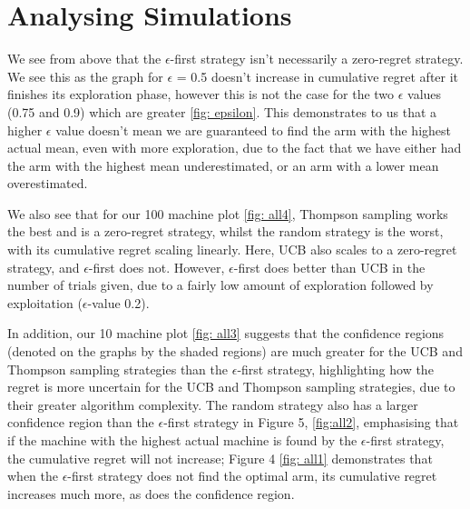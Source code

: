 \section{Analysing Simulations}
We see from above that the $\epsilon$-first strategy isn't necessarily a zero-regret strategy. We see this as the graph for $\epsilon$ = 0.5 doesn't increase in cumulative regret after it finishes its exploration phase, however this is not the case for the two $\epsilon$ values (0.75 and 0.9) which are greater \ref{fig: epsilon}. This demonstrates to us that a higher $\epsilon$ value doesn't mean we are guaranteed to find the arm with the highest actual mean, even with more exploration, due to the fact that we have either had the arm with the highest mean underestimated, or an arm with a lower mean overestimated.

We also see that for our 100 machine plot \ref{fig: all4}, Thompson sampling works the best and is a zero-regret strategy, whilst the random strategy is the worst, with its cumulative regret scaling linearly. Here, UCB also scales to a zero-regret strategy, and $\epsilon$-first does not. However, $\epsilon$-first does better than UCB in the number of trials given, due to a fairly low amount of exploration followed by exploitation ($\epsilon$-value 0.2).

In addition, our 10 machine plot \ref{fig: all3} suggests that the confidence regions (denoted on the graphs by the shaded regions) are much greater for the UCB and Thompson sampling strategies than the $\epsilon$-first strategy, highlighting how the regret is more uncertain for the UCB and Thompson sampling strategies, due to their greater algorithm complexity. The random strategy also has a larger confidence region than the $\epsilon$-first strategy in Figure 5, \ref{fig:all2}, emphasising that if the machine with the highest actual machine is found by the $\epsilon$-first strategy, the cumulative regret will not increase; Figure 4 \ref{fig: all1} demonstrates that when the $\epsilon$-first strategy does not find the optimal arm, its cumulative regret increases much more, as does the confidence region.